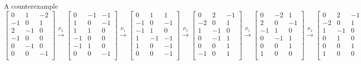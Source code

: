 \documentclass{beamer}
\begin{document}
\begin{frame}{A counterexample}
$\begin{bmatrix}
0 &1 & -2\\
-1 & 0 & 1\\
2 & -1 & 0\\
-1 & 0 & 0\\
0 & -1 & 0\\
0 & 0 & -1\\
\end{bmatrix}\overset{\mu_2}{\to}\begin{bmatrix} 
0 &-1 & -1\\
1 & 0 & -1\\
1 & 1 & 0\\
-1 & 0 & 0\\
-1 & 1 & 0\\
0 & 0 & -1\\
\end{bmatrix}\overset{\mu_1}{\to}\begin{bmatrix} 
0 &1 & 1\\
-1 & 0 & -1\\
-1 & 1 & 0\\
1 & -1 & -1\\
1 & 0 & -1\\
0 & 0 & -1\\
\end{bmatrix}\overset{\mu_3}{\to}\begin{bmatrix} 
0 &2 & -1\\
-2 & 0 & 1\\
1 & -1 & 0\\
0 & -1 & 1\\
0 & 0 & 1\\
-1 & 0 & 1\\
\end{bmatrix}\overset{\mu_1}{\to}\begin{bmatrix} 
0 &-2 & 1\\
2 & 0 & -1\\
-1 & 1 & 0\\
0 & -1 & 1\\
0 & 0 & 1\\
1 & 0 & 0\\
\end{bmatrix}\overset{\mu_2}{\to}\begin{bmatrix} 
0 &2 & -1\\
-2 & 0 & 1\\
1 & -1 & 0\\
0 & 1 & 0\\
0 & 0 & 1\\
1 & 0 & 0\\
\end{bmatrix}$
\end{frame}
\end{document}

